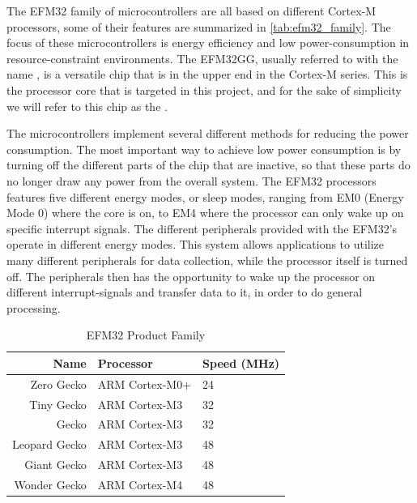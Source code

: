 The EFM32 family of microcontrollers are all based on different Cortex-M processors, some of their features are summarized in \autoref{tab:efm32_family}.
The focus of these microcontrollers is energy efficiency and low power-consumption in resource-constraint environments.
The EFM32GG, usually referred to with the name , is a versatile chip that is in the upper end in the Cortex-M series.
This is the processor core that is targeted in this project, and for the sake of simplicity we will refer to this chip as the \gecko.

The microcontrollers implement several different methods for reducing the power consumption.
The most important way to achieve low power consumption is by turning off the different parts of the chip that are inactive, so that these parts do no longer draw any power from the overall system.
The EFM32 processors features five different energy modes, or sleep modes, ranging from EM0 (Energy Mode 0) where the core is on, to EM4 where the processor can only wake up on specific interrupt signals.
The different peripherals provided with the EFM32's operate in different energy modes.
This system allows applications to utilize many different peripherals for data collection, while the processor itself is turned off.
The peripherals then has the opportunity to wake up the processor on different interrupt-signals and transfer data to it, in order to do general processing.

\begin{table}[b]
\begin{center}
    \begin{tabular}{r|l|l}
    \textbf{Name} & \textbf{Processor} & \textbf{Speed (MHz)} \\
    \hline
    Zero Gecko    & ARM Cortex-M0+ & 24 \\
    Tiny Gecko    & ARM Cortex-M3  & 32 \\
    Gecko         & ARM Cortex-M3  & 32 \\
    Leopard Gecko & ARM Cortex-M3  & 48 \\
    Giant Gecko   & ARM Cortex-M3  & 48 \\
    Wonder Gecko  & ARM Cortex-M4  & 48 \\
    \hline
    \end{tabular}
\end{center}
\caption{EFM32 Product Family \cite{web:silabs}}
\label{tab:efm32_family}
\end{table}

